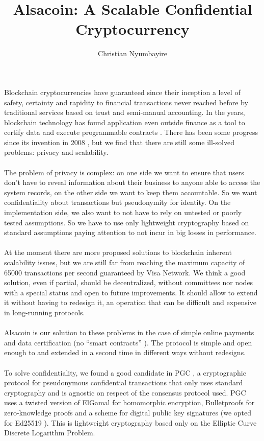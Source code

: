 \documentclass[a4paper,10pt]{article}
\title{Alsacoin: A Scalable Confidential Cryptocurrency}
\author{Christian Nyumbayire}
\begin{document}
\maketitle

Blockchain cryptocurrencies \cite{1, 2, 3, 4} have guaranteed since their inception a level of safety, certainty and rapidity to financial transactions never reached before by traditional services based on trust and semi-manual accounting. In the years, blockchain technology has found application even outside finance as a tool to certify data and execute programmable contracts \cite{5}. There has been some progress since its invention in 2008 \cite{3}, but we find that there are still some ill-solved problems:
privacy and scalability.\\\\

The problem of privacy is complex: on one side we want to ensure that users don’t have to reveal information about their business to anyone able to access the system records, on the other side we want to keep them accountable. So we want confidentiality about transactions but pseudonymity for identity. On the implementation side, we also want to not have to rely on untested or poorly tested assumptions. So we have to use only lightweight cryptography based on standard assumptions paying
attention to not incur in big losses in performance.\\\\

At the moment there are more proposed solutions to blockchain inherent scalability issues, but we are still far from reaching the maximum capacity of 65000 transactions per second guaranteed by Visa Network. We think a good solution, even if partial, should be decentralized, without committees nor nodes with a special status and open to future improvements. It should allow to extend it without having to redesign it, an operation that can be difficult and expensive in long-running protocols.\\\\

Alsacoin is our solution to these problems in the case of simple online payments and data certification (no “smart contracts” \cite{5}). The protocol is simple and open enough to and extended in a second time in different ways without redesigns.\\\\

To solve confidentiality, we found a good candidate in PGC \cite{9}, a cryptographic protocol for pseudonymous confidential transactions that only uses standard cryptography and is agnostic on respect of the consensus protocol used. PGC uses a twisted version of ElGamal \cite{7} for homomorphic encryption, Bulletproofs \cite{8} for zero-knowledge proofs and a scheme for digital public key signatures (we opted for Ed25519 \cite{6}). This is lightweight cryptography based only on the Elliptic Curve Discrete Logarithm Problem.\\\\
\end{document}

